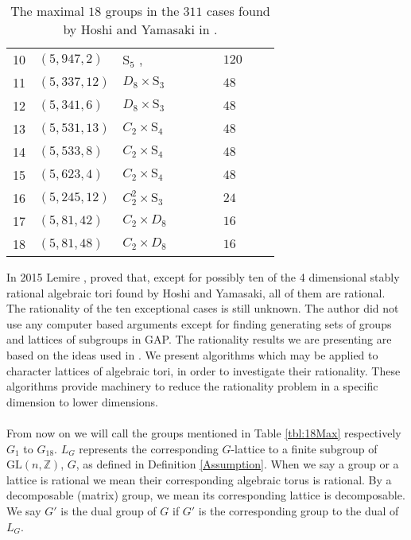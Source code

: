 \documentclass{article}
\theoremstyle{plain}
\theoremstyle{definition}
\newcommand{\Z}{\ensuremath{\mathbb{Z}}}
\begin{document}
\begin{table}[H]
\begin{tabular}{llllll}
10 & $(5,947,2)$ & $\mathrm{S}_5$ ,\,\,\,\,\,\,\,\,\,\,\,\,\,\,\,\,\,\,\,\,\,\,\,\,\,\,\,\,\,\ & $120$ \\%
11 & $(5,337,12)$ & $D_8\times \mathrm{S}_3$ & $48$ \\%
12  & $(5,341,6)$ & $D_8\times \mathrm{S}_3$ & $48$ \\%
13  & $(5,531,13)$ & $C_2\times \mathrm{S}_4$ & $48$ \\%
14  & $(5,533,8)$ & $C_2\times \mathrm{S}_4$ & $48$ \\%
15 & $(5,623,4)$ & $C_2\times \mathrm{S}_4$ & $48$\\%
16   & $(5,245,12)$ & $C_2^2\times \mathrm{S}_3$ & $24$\\%
17  & $(5,81,42)$ & $C_2\times D_8$ & $16$ \\%
18  & $(5,81,48)$ & $C_2\times D_8$ & $16$ \\%
\end{tabular}
\caption{The maximal $18$ groups 
in the  $311$ cases found by Hoshi and Yamasaki in \cite{Hoshi}.}
\end{table}
\noindent
In 2015 Lemire \cite{Nicole1}, proved that, except for possibly ten of the 4 dimensional stably rational algebraic tori found by Hoshi and Yamasaki, all of them are rational. The rationality of the ten exceptional cases is still unknown. The author did not use any computer based arguments except for finding generating sets of groups and lattices of subgroups in GAP. The rationality results we are presenting are based on the ideas used in \cite{Nicole1}. We present algorithms which may be applied to character lattices of algebraic tori, in order to investigate their rationality. These algorithms provide machinery to reduce the rationality problem in a specific dimension to lower dimensions.\\
\\
From now on we will call the groups mentioned in Table \ref{tbl:18Max} respectively $G_1$ to $G_{18}$. $L_G$ represents the corresponding $G$-lattice to a finite subgroup of $\mathrm{GL}(n,\Z)$, $G$, as defined in Definition \ref{Assumption}. When we say a group or a lattice is rational we mean their corresponding algebraic torus is rational. By a decomposable (matrix) group, we mean its corresponding lattice is decomposable. We say $G'$ is the dual group of $G$ if $G'$ is the corresponding group to the dual of $L_G$.  \\
\end{document}
